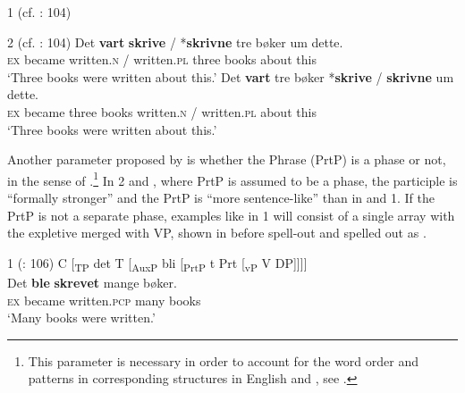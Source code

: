 \documentclass[output=paper]{LSP/langsci}
\begin{document}
\ea%
    \label{ex:engdahl:3}
     1 (cf. \citealt{Holmberg2002Expletives}: 104)
\z
\z


\ea\label{ex:engdahl:4}
 2 (cf. \citealt{Holmberg2002Expletives}: 104)
\ea
\gll Det   \textbf{vart}  \textbf{skrive} /     *\textbf{skrivne}  tre  bøker   um     dette.\\
   \textsc{ex}     became   written.\textsc{n} /  written.\textsc{pl}    three    books  about  this \\
   \glt ‘Three books were written about this.'
\ex
\gll Det   \textbf{vart}  tre     bøker *\textbf{skrive} /     \textbf{skrivne}     um     dette.\\
 \textsc{ex}     became three  books   written.\textsc{n} / written.\textsc{pl} about  this\\
 \glt ‘Three books were written about this.'
\z
\z

\noindent Another parameter proposed by \citet[106f]{Holmberg2002Expletives} is whether the  Phrase (PrtP) is a phase or not, in the sense of \citet{Chomsky2001}.\footnote{This parameter is necessary in order to account for the word order and  patterns in corresponding structures in English and , see \citet[105]{Holmberg2002Expletives}.} In  2 and , where PrtP is assumed to be a phase, the participle is “formally stronger” and the PrtP is “more sentence-like” than in  and  1. If the PrtP is not a separate phase, examples like  in  1 will consist of a single array with the expletive merged with VP, shown in  before spell-out and spelled out as .

\ea%
\label{ex:engdahl:5}
 1 (\citealt{Holmberg2002Expletives}: 106)
\ea \label{ex:engdahl:5a}
C [\textsubscript{TP} det T [\textsubscript{AuxP} bli [\textsubscript{PrtP} t Prt [\textsubscript{vP} V DP]]]]\\
\ex \label{ex:engdahl:5b}
\gll Det  \textbf{ble}   \textbf{skrevet} mange    bøker.\\
    \textsc{ex}    became  written.\textsc{pcp}  many    books\\
    \glt ‘Many books were written.'
\z
\z
\end{document}
